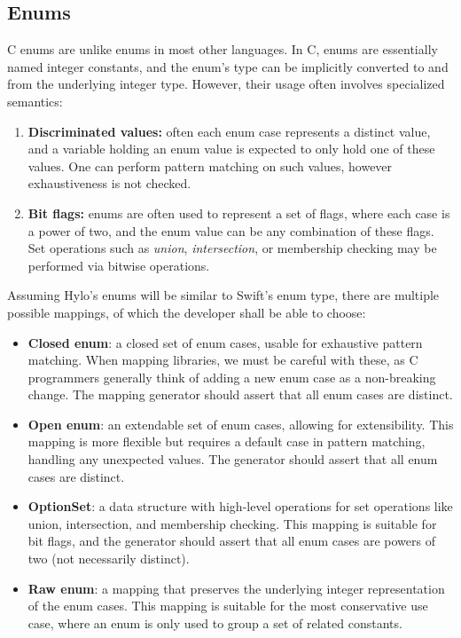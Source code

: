 \subsection{Enums}
C enums are unlike enums in most other languages. In C, enums are essentially named integer constants, and the enum's type can be implicitly converted to and from the underlying integer type. However, their usage often involves specialized semantics:
\begin{enumerate}
    \item \textbf{Discriminated values:} often each enum case represents a distinct value, and a variable holding an enum value is expected to only hold one of these values. One can perform pattern matching on such values, however exhaustiveness is not checked.
    \item \textbf{Bit flags:} enums are often used to represent a set of flags, where each case is a power of two, and the enum value can be any combination of these flags. Set operations such as \textit{union}, \textit{intersection}, or membership checking may be performed via bitwise operations. 
\end{enumerate}

Assuming Hylo's enums will be similar to Swift's enum type, there are multiple possible mappings, of which the developer shall be able to choose:
\begin{itemize}
    \item \textbf{Closed enum}: a closed set of enum cases, usable for exhaustive pattern matching. When mapping libraries, we must be careful with these, as C programmers generally think of adding a new enum case as a non-breaking change. The mapping generator should assert that all enum cases are distinct.
    \item \textbf{Open enum}: an extendable set of enum cases, allowing for extensibility. This mapping is more flexible but requires a default case in pattern matching, handling any unexpected values. The generator should assert that all enum cases are distinct.
    \item \textbf{OptionSet}: a data structure with high-level operations for set operations like union, intersection, and membership checking. This mapping is suitable for bit flags, and the generator should assert that all enum cases are powers of two (not necessarily distinct).
    \item \textbf{Raw enum}: a mapping that preserves the underlying integer representation of the enum cases. This mapping is suitable for the most conservative use case, where an enum is only used to group a set of related constants.
\end{itemize}

